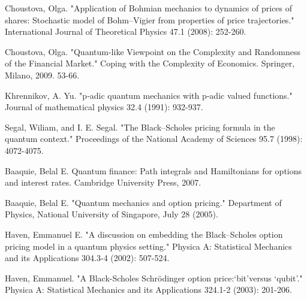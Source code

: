 \documentclass[a4paper,titlepage,12pt,fleqn,oneside]{report}
\begin{document}
\begin{thebibliography}{99}
	\begin{LTRitems}
		Choustova, Olga. "Application of Bohmian mechanics to dynamics of prices of shares: Stochastic model of Bohm–Vigier from properties of price trajectories." International Journal of Theoretical Physics 47.1 (2008): 252-260.
	\end{LTRitems}
	
	\begin{LTRitems}
		\bibitem{olg7}
		Choustova, Olga. "Quantum-like Viewpoint on the Complexity and Randomness of the Financial Market." Coping with the Complexity of Economics. Springer, Milano, 2009. 53-66.
	\end{LTRitems}
	
	\begin{LTRitems}
		\bibitem{kh8}
		Khrennikov, A. Yu. "p‐adic quantum mechanics with p‐adic valued functions." Journal of mathematical physics 32.4 (1991): 932-937.
	\end{LTRitems}
	
	\begin{LTRitems}
		\bibitem{seg}
		Segal, Wiliam, and I. E. Segal. "The Black–Scholes pricing formula in the quantum context." Proceedings of the National Academy of Sciences 95.7 (1998): 4072-4075.
	\end{LTRitems}
	
	\begin{LTRitems}
		\bibitem{baq1}
		Baaquie, Belal E. Quantum finance: Path integrals and Hamiltonians for options and interest rates. Cambridge University Press, 2007.
	\end{LTRitems}
	
	\begin{LTRitems}
		\bibitem{baq2}
		Baaquie, Belal E. "Quantum mechanics and option pricing." Department of Physics, National University of Singapore, July 28 (2005).
	\end{LTRitems}
	
	\begin{LTRitems}
		\bibitem{haven2}
		Haven, Emmanuel E. "A discussion on embedding the Black–Scholes option pricing model in a quantum physics setting." Physica A: Statistical Mechanics and its Applications 304.3-4 (2002): 507-524.
	\end{LTRitems}
	
	\begin{LTRitems}
		\bibitem{haven3}
		Haven, Emmanuel. "A Black-Scholes Schrödinger option price:‘bit’versus ‘qubit’." Physica A: Statistical Mechanics and its Applications 324.1-2 (2003): 201-206.
	\end{LTRitems}
	

\end{thebibliography}
\end{document}
